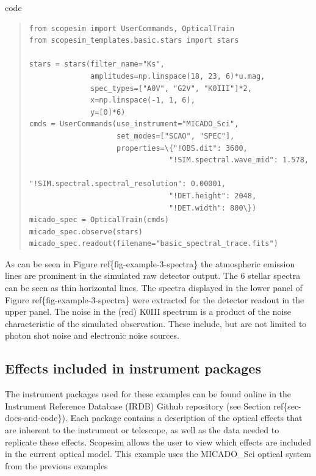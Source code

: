 \label{code-example-3-spectra}
\begin{DUclass}{code}
\begin{quote}
\begin{alltt}
\begin{lstlisting}[frame=single]
from scopesim import UserCommands, OpticalTrain
from scopesim_templates.basic.stars import stars

stars = stars(filter_name="Ks",
              amplitudes=np.linspace(18, 23, 6)*u.mag,
              spec_types=["A0V", "G2V", "K0III"]*2,
              x=np.linspace(-1, 1, 6),
              y=[0]*6)
cmds = UserCommands(use_instrument="MICADO_Sci",
                    set_modes=["SCAO", "SPEC"],
                    properties=\{"!OBS.dit": 3600,
                                "!SIM.spectral.wave_mid": 1.578,
                                "!SIM.spectral.spectral_resolution": 0.00001,
                                "!DET.height": 2048,
                                "!DET.width": 800\})
micado_spec = OpticalTrain(cmds)
micado_spec.observe(stars)
micado_spec.readout(filename="basic_spectral_trace.fits")
\end{lstlisting}
\end{alltt}
\end{quote}
\end{DUclass}

As can be seen in Figure ref\{fig-example-3-spectra\} the atmospheric emission lines are prominent in the simulated raw detector output.
The 6 stellar spectra can be seen as thin horizontal lines.
The spectra displayed in the lower panel of Figure ref\{fig-example-3-spectra\} were extracted for the detector readout in the upper panel.
The noise in the (red) K0III spectrum is a product of the noise characteristic of the simulated observation.
These include, but are not limited to photon shot noise and electronic noise sources.


\subsection{Effects included in instrument packages%
  \label{effects-included-in-instrument-packages}%
}

The instrument packages used for these examples can be found online in the Instrument Reference Database (IRDB) Github repository (see Section ref\{sec-docs-and-code\}).
Each package contains a description of the optical effects that are inherent to the instrument or telescope, as well as the data needed to replicate these effects.
Scopesim allows the user to view which effects are included in the current optical model.
This example uses the MICADO\_Sci optical system from the previous examples

